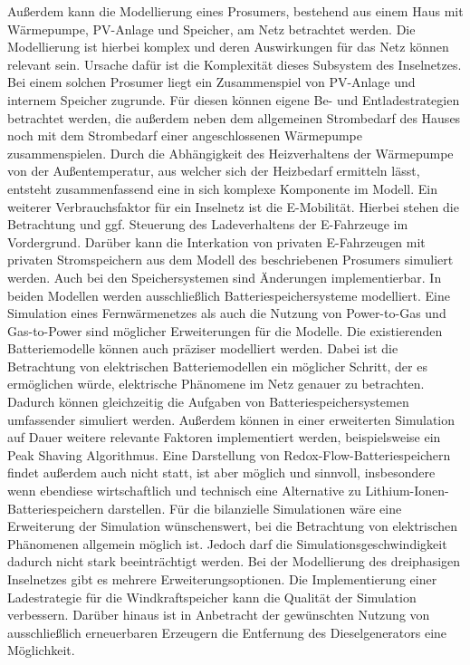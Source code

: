 Außerdem kann die Modellierung eines Prosumers, bestehend aus einem Haus mit Wärmepumpe, PV-Anlage und Speicher, am Netz betrachtet werden.
Die Modellierung ist hierbei komplex und deren Auswirkungen für das Netz können relevant sein.
Ursache dafür ist die Komplexität dieses Subsystem des Inselnetzes.
Bei einem solchen Prosumer liegt ein Zusammenspiel von PV-Anlage und internem Speicher zugrunde.
Für diesen können eigene Be- und Entladestrategien betrachtet werden, die außerdem neben dem allgemeinen Strombedarf des Hauses noch mit dem Strombedarf einer angeschlossenen Wärmepumpe zusammenspielen.
Durch die Abhängigkeit des Heizverhaltens der Wärmepumpe von der Außentemperatur, aus welcher sich der Heizbedarf ermitteln lässt, entsteht zusammenfassend eine in sich komplexe Komponente im Modell.
Ein weiterer Verbrauchsfaktor für ein Inselnetz ist die E-Mobilität.
Hierbei stehen die Betrachtung und ggf. Steuerung des Ladeverhaltens der E-Fahrzeuge im Vordergrund.
Darüber kann die Interkation von privaten E-Fahrzeugen mit privaten Stromspeichern aus dem Modell des beschriebenen Prosumers simuliert werden.
Auch bei den Speichersystemen sind Änderungen implementierbar.
In beiden Modellen werden ausschließlich Batteriespeichersysteme modelliert.
Eine Simulation eines Fernwärmenetzes als auch die Nutzung von Power-to-Gas und Gas-to-Power sind möglicher Erweiterungen für die Modelle.
Die existierenden Batteriemodelle können auch präziser modelliert werden.
Dabei ist die Betrachtung von elektrischen Batteriemodellen ein möglicher Schritt, der es ermöglichen würde, elektrische Phänomene im Netz genauer zu betrachten.
Dadurch können gleichzeitig die Aufgaben von Batteriespeichersystemen umfassender simuliert werden.
Außerdem können in einer erweiterten Simulation auf Dauer weitere relevante Faktoren implementiert werden, beispielsweise ein Peak Shaving Algorithmus.
Eine Darstellung von Redox-Flow-Batteriespeichern findet außerdem auch nicht statt, ist aber möglich und sinnvoll, insbesondere wenn ebendiese wirtschaftlich und technisch eine Alternative zu Lithium-Ionen-Batteriespeichern darstellen.
Für die bilanzielle Simulationen wäre eine Erweiterung der Simulation wünschenswert, bei die Betrachtung von elektrischen Phänomenen allgemein möglich ist. 
Jedoch darf die Simulationsgeschwindigkeit dadurch nicht stark beeinträchtigt werden.
Bei der Modellierung des dreiphasigen Inselnetzes gibt es mehrere Erweiterungsoptionen. 
Die Implementierung einer Ladestrategie für die Windkraftspeicher kann die Qualität der Simulation verbessern.
Darüber hinaus ist in Anbetracht der gewünschten Nutzung von ausschließlich erneuerbaren Erzeugern die Entfernung des Dieselgenerators eine Möglichkeit.
